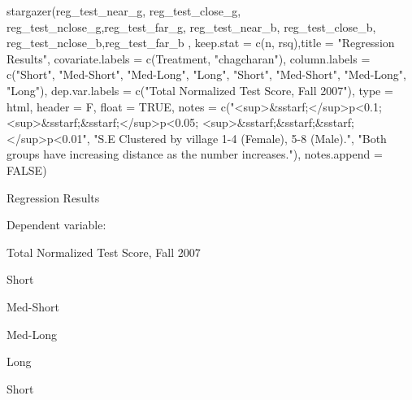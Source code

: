 \documentclass[
]{article}
\newenvironment{Shaded}{\begin{snugshade}}{\end{snugshade}}
\newcommand{\AttributeTok}[1]{\textcolor[rgb]{0.77,0.63,0.00}{#1}}
\newcommand{\ConstantTok}[1]{\textcolor[rgb]{0.00,0.00,0.00}{#1}}
\newcommand{\FunctionTok}[1]{\textcolor[rgb]{0.00,0.00,0.00}{#1}}
\newcommand{\NormalTok}[1]{#1}
\newcommand{\StringTok}[1]{\textcolor[rgb]{0.31,0.60,0.02}{#1}}
\begin{document}
\begin{Shaded}
\begin{Highlighting}[]
\FunctionTok{stargazer}\NormalTok{(reg\_test\_near\_g, reg\_test\_close\_g, reg\_test\_nclose\_g,reg\_test\_far\_g, reg\_test\_near\_b, reg\_test\_close\_b, reg\_test\_nclose\_b,reg\_test\_far\_b , }\AttributeTok{keep.stat =} \FunctionTok{c}\NormalTok{(}\StringTok{\textquotesingle{}n\textquotesingle{}}\NormalTok{, }\StringTok{\textquotesingle{}rsq\textquotesingle{}}\NormalTok{),}\AttributeTok{title =} \StringTok{"Regression Results"}\NormalTok{,}
          \AttributeTok{covariate.labels =} \FunctionTok{c}\NormalTok{(}\StringTok{\textquotesingle{}Treatment\textquotesingle{}}\NormalTok{, }\StringTok{"chagcharan"}\NormalTok{), }\AttributeTok{column.labels =} \FunctionTok{c}\NormalTok{(}\StringTok{"Short"}\NormalTok{, }\StringTok{"Med{-}Short"}\NormalTok{, }\StringTok{"Med{-}Long"}\NormalTok{, }\StringTok{"Long"}\NormalTok{, }\StringTok{"Short"}\NormalTok{, }\StringTok{"Med{-}Short"}\NormalTok{, }\StringTok{"Med{-}Long"}\NormalTok{, }\StringTok{"Long"}\NormalTok{),}
          \AttributeTok{dep.var.labels =} \FunctionTok{c}\NormalTok{(}\StringTok{"Total Normalized Test Score, Fall 2007"}\NormalTok{), }
          \AttributeTok{type =} \StringTok{\textquotesingle{}html\textquotesingle{}}\NormalTok{, }\AttributeTok{header =}\NormalTok{ F, }\AttributeTok{float =} \ConstantTok{TRUE}\NormalTok{,  }\AttributeTok{notes =} \FunctionTok{c}\NormalTok{(}\StringTok{"\textless{}sup\textgreater{}\&sstarf;\textless{}/sup\textgreater{}p\textless{}0.1; \textless{}sup\textgreater{}\&sstarf;\&sstarf;\textless{}/sup\textgreater{}p\textless{}0.05; \textless{}sup\textgreater{}\&sstarf;\&sstarf;\&sstarf;\textless{}/sup\textgreater{}p\textless{}0.01"}\NormalTok{, }\StringTok{"S.E Clustered by village 1{-}4 (Female), 5{-}8 (Male)."}\NormalTok{, }
          \StringTok{"Both groups have increasing distance as the number increases."}\NormalTok{), }\AttributeTok{notes.append =} \ConstantTok{FALSE}\NormalTok{)}
\end{Highlighting}
\end{Shaded}

Regression Results

Dependent variable:

Total Normalized Test Score, Fall 2007

Short

Med-Short

Med-Long

Long

Short
\end{document}
